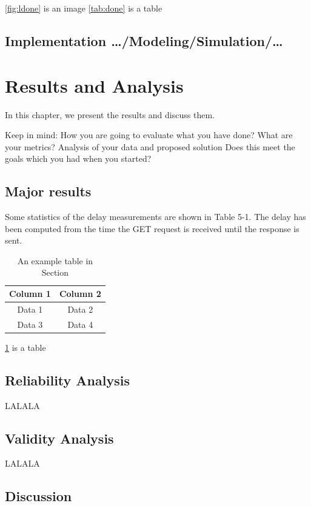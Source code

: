 \documentclass[a4paper,10pt,twocolumn]{article}
\numberwithin{figure}{section}
\numberwithin{table}{section}
\begin{document}
\ref{fig:ldone} is an image 
\ref{tab:done} is a table


\subsection{Implementation …/Modeling/Simulation/…}






\section{Results and Analysis}
In this chapter, we present the results and discuss them.

Keep in mind: How you are going to evaluate what you have done? What are your metrics?
Analysis of your data and proposed solution
Does this meet the goals which you had when you started?

\subsection{Major results}
Some statistics of the delay measurements are shown in Table 5-1.
The delay has been computed from the time the GET request is received until the response is
sent.

\begin{table}[htbp]
    \centering
    \begin{tabular}{|c|c|}
        \hline
        Column 1 & Column 2 \\
        \hline
        Data 1 & Data 2 \\
        Data 3 & Data 4 \\
        \hline
    \end{tabular}
    \caption{An example table in Section}
    \label{tab:res}  
\end{table}

\ref{tab:res} is a table

\subsection{Reliability Analysis}
LALALA

\subsection{Validity Analysis}
LALALA


\subsection{Discussion}
\end{document}
